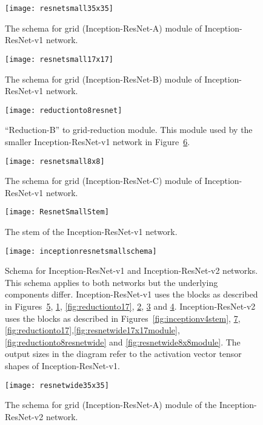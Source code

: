 \documentclass[10pt,twocolumn,letterpaper]{article}
\begin{document}
\begin{figure}
\centering
\texttt{[image: resnetsmall35x35]}
\caption{The schema for  grid (Inception-ResNet-A) module of Inception-ResNet-v1
 network.}
\label{fig:resnetsmall35x35module}
\end{figure}
\begin{figure}
\centering
\texttt{[image: resnetsmall17x17]}
\caption{The schema for  grid (Inception-ResNet-B)  module of Inception-ResNet-v1
 network.}
\label{fig:resnetsmall17x17module}
\end{figure}
\begin{figure}
\centering
\texttt{[image: reductionto8resnet]}
\caption{``Reduction-B''  to  grid-reduction module.
  This module used by the smaller Inception-ResNet-v1 network
  in Figure~\ref{fig:resnetsmallschema}.
}
\label{fig:reductionto8resnet}
\end{figure}
\begin{figure}
\centering
\texttt{[image: resnetsmall8x8]}
\caption{The schema for  grid (Inception-ResNet-C) module of Inception-ResNet-v1
 network.}
\label{fig:resnetsmall8x8module}
\end{figure}
\begin{figure}
\centering
\texttt{[image: ResnetSmallStem]}
\caption{The stem of the Inception-ResNet-v1 network.}
\label{fig:resnetsmallstem}
\end{figure}
\begin{figure}
\centering
\texttt{[image: inceptionresnetsmallschema]}
\caption{Schema for Inception-ResNet-v1 and Inception-ResNet-v2 networks.
  This schema applies to both networks but the underlying components differ.
  Inception-ResNet-v1 uses the blocks as described in Figures~\ref{fig:resnetsmallstem},
  \ref{fig:resnetsmall35x35module}, \ref{fig:reductionto17}, \ref{fig:resnetsmall17x17module},
  \ref{fig:reductionto8resnet} and \ref{fig:resnetsmall8x8module}.
  Inception-ResNet-v2 uses the blocks as described in Figures~\ref{fig:inceptionv4stem},
  \ref{fig:resnetwide35x35module}, \ref{fig:reductionto17},\ref{fig:resnetwide17x17module},
  \ref{fig:reductionto8resnetwide} and \ref{fig:resnetwide8x8module}.
  The output sizes in the diagram refer to the activation vector tensor shapes of
  Inception-ResNet-v1.
}
\label{fig:resnetsmallschema}
\end{figure}
\clearpage
\begin{figure}
\centering
\texttt{[image: resnetwide35x35]}\caption{The schema for
   grid (Inception-ResNet-A) module of the Inception-ResNet-v2 network.}
\label{fig:resnetwide35x35module}
\end{figure}
\end{document}
